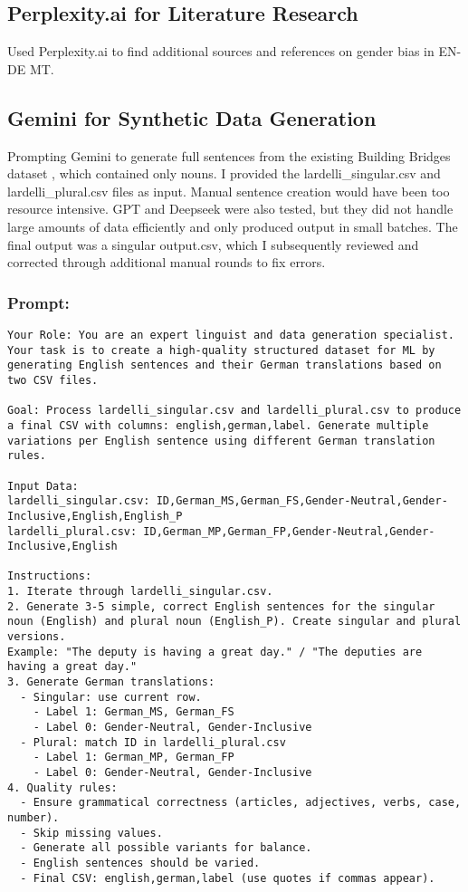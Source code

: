 \begin{appendices}
\subsection{Perplexity.ai for Literature Research}
Used Perplexity.ai to find additional sources and references on gender bias in EN-DE MT.



\subsection{Gemini for Synthetic Data Generation}\label{appendix:gemini_prompt}
Prompting Gemini to generate full sentences from the existing Building Bridges dataset \parencite{lardelliBuildingBridgesDataset2024}, which contained only nouns. I provided the lardelli\_singular.csv and lardelli\_plural.csv files as input. Manual sentence creation would have been too resource intensive. GPT and Deepseek were also tested, but they did not handle large amounts of data efficiently and only produced output in small batches. The final output was a singular output.csv, which I subsequently reviewed and corrected through additional manual rounds to fix errors.
\subsubsection{Prompt: } 

\begin{lstlisting}
Your Role: You are an expert linguist and data generation specialist. Your task is to create a high-quality structured dataset for ML by generating English sentences and their German translations based on two CSV files.

Goal: Process lardelli_singular.csv and lardelli_plural.csv to produce a final CSV with columns: english,german,label. Generate multiple variations per English sentence using different German translation rules.

Input Data:
lardelli_singular.csv: ID,German_MS,German_FS,Gender-Neutral,Gender-Inclusive,English,English_P
lardelli_plural.csv: ID,German_MP,German_FP,Gender-Neutral,Gender-Inclusive,English

Instructions:
1. Iterate through lardelli_singular.csv.
2. Generate 3-5 simple, correct English sentences for the singular noun (English) and plural noun (English_P). Create singular and plural versions.
Example: "The deputy is having a great day." / "The deputies are having a great day."
3. Generate German translations:
  - Singular: use current row.
    - Label 1: German_MS, German_FS
    - Label 0: Gender-Neutral, Gender-Inclusive
  - Plural: match ID in lardelli_plural.csv
    - Label 1: German_MP, German_FP
    - Label 0: Gender-Neutral, Gender-Inclusive
4. Quality rules:
  - Ensure grammatical correctness (articles, adjectives, verbs, case, number).
  - Skip missing values.
  - Generate all possible variants for balance.
  - English sentences should be varied.
  - Final CSV: english,german,label (use quotes if commas appear).


\end{lstlisting}
\end{appendices}
